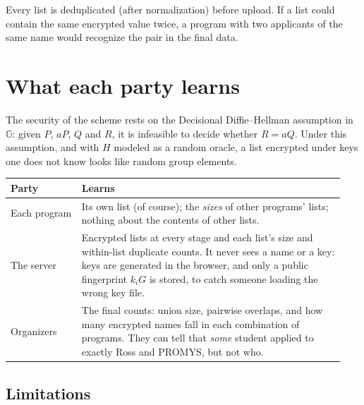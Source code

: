 \documentclass[11pt]{article}
\newcommand{\G}{\mathbb{G}}
\begin{document}
Every list is deduplicated (after normalization) before upload. If a list could contain the same
encrypted value twice, a program with two applicants of the same name would recognize the pair in
the final data.

\section{What each party learns}\label{sec:learns}

The security of the scheme rests on the Decisional Diffie--Hellman assumption in $\G$: given
$P$, $aP$, $Q$ and $R$, it is infeasible to decide whether $R = aQ$. Under this assumption, and
with $H$ modeled as a random oracle, a list encrypted under keys one does not know looks like
random group elements.

\begin{center}
\begin{tabular}{@{}p{0.2\linewidth}p{0.74\linewidth}@{}}
  \toprule
  \textbf{Party} & \textbf{Learns} \\
  \midrule
  Each program & Its own list (of course); the \emph{sizes} of other programs' lists; nothing about
                 the contents of other lists. \\
  The server   & Encrypted lists at every stage and each list's size and within-list duplicate
                 counts. It never sees a name or a key: keys are generated in the browser, and only
                 a public fingerprint $k_i G$ is stored, to catch someone loading the wrong key file. \\
  Organizers   & The final counts: union size, pairwise overlaps, and how many encrypted names fall
                 in each combination of programs. They can tell that \emph{some} student applied to
                 exactly Ross and PROMYS, but not who. \\
  \bottomrule
\end{tabular}
\end{center}

\subsection*{Limitations}
\end{document}
